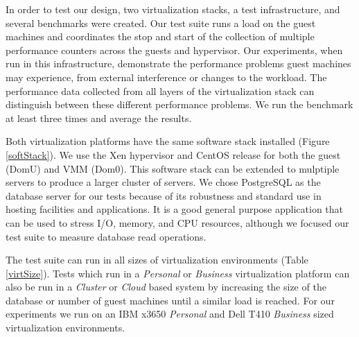 In order to test our design, two virtualization stacks, a test infrastructure, and several benchmarks were created.  Our test suite runs a load on the guest machines and coordinates the stop and start of the collection of multiple performance counters across the guests and hypervisor.     
Our experiments, when run in this infrastructure, demonstrate the performance problems guest machines may experience, from external interference or changes to the workload.  The performance data collected from all layers of the virtualization stack can distinguish between these different performance problems.  We run the benchmark at least three times and average the results.

Both virtualization platforms have the same software stack installed (Figure \ref{softStack}).  
We use the Xen hypervisor and CentOS release for both the guest (DomU) and VMM (Dom0).  
This software stack can be extended to mulptiple servers to produce a larger cluster of servers.  
We chose PostgreSQL as the database server for our tests because of its robustness and standard use in hosting facilities and applications.  
It is a good general purpose application that can be used to stress I/O, memory, and CPU resources, although we focused our test suite to measure database read operations.

The test suite can run in all sizes of virtualization environments (Table \ref{virtSize}).  
Tests which run in a \emph{Personal} or \emph{Business} virtualization platform can also be run in a \emph{Cluster} or \emph{Cloud} based system by increasing the size of the database or number of guest machines until a similar load is reached.  
For our experiments we run on an IBM x3650 \emph{Personal} and Dell T410 \emph{Business} sized virtualization environments. 

